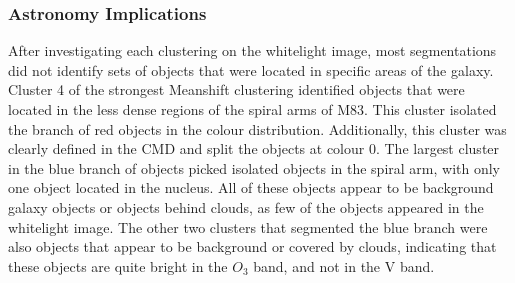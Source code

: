 \subsubsection{Astronomy Implications}
After investigating each clustering on the whitelight image, most segmentations did not identify sets of objects that were located in specific areas of the galaxy.
Cluster 4 of the strongest Meanshift clustering identified objects that were located in the less dense regions of the spiral arms of M83.
This cluster isolated the branch of red objects in the colour distribution. Additionally, this cluster was clearly defined in the CMD and split the objects at colour 0.
The largest cluster in the blue branch of objects picked isolated objects in the spiral arm, with only one object located in the nucleus.
All of these objects appear to be background galaxy objects or objects behind clouds, as few of the objects appeared in the whitelight image.
The other two clusters that segmented the blue branch were also objects that appear to be background or covered by clouds, indicating that these objects are quite bright in the $O_{3}$ band, and not in the V band.

